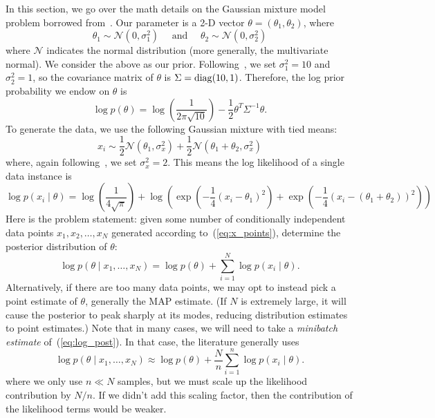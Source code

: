 \documentclass{article}
\begin{document}
In this section, we go over the math details on the Gaussian mixture model problem borrowed
from~\cite{langevin_2011}. Our parameter is a 2-D vector $\theta =
(\theta_1, \theta_2)$, where
\begin{equation}
\theta_1 \sim \mathcal{N}(0, \sigma_1^2) \quad \mbox{ and } \quad \theta_2 \sim \mathcal{N}(0, \sigma_2^2)
\end{equation}
where $\mathcal{N}$ indicates the normal distribution (more generally, the multivariate normal). We
consider the above as our prior. Following~\cite{langevin_2011}, we set $\sigma_1^2 = 10$ and
$\sigma_2^2=1$, so the covariance matrix of $\theta$ is $\Sigma = {\rm diag}(10,1)$. Therefore, the
log prior probability we endow on $\theta$ is
\begin{equation}
\log p(\theta) = \log \left(\frac{1}{2\pi\sqrt{10}}\right) - \frac{1}{2}\theta^T\Sigma^{-1}\theta.
\end{equation}
To generate the data, we use the following Gaussian mixture with tied means:
\begin{equation}\label{eq:x_points}
x_i \sim \frac{1}{2}\mathcal{N}(\theta_1, \sigma_x^2) + \frac{1}{2}\mathcal{N}(\theta_1+\theta_2, \sigma_x^2)
\end{equation}
where, again following~\cite{langevin_2011}, we set $\sigma_x^2 = 2$. This means the log likelihood
of a single data instance is
\begin{equation}
\log p(x_i \mid \theta) = \log\left(\frac{1}{4\sqrt{\pi}}\right) +
\log\left(\exp\left(-\frac{1}{4}(x_i - \theta_1)^2\right) + \exp\left(-\frac{1}{4}(x_i -
(\theta_1+\theta_2))^2\right)\right)
\end{equation}
Here is the problem statement: given some number of conditionally independent data points $x_1, x_2,
\ldots, x_N$ generated according to~(\ref{eq:x_points}), determine the posterior
distribution of $\theta$:
\begin{equation}\label{eq:log_post}
\log p(\theta \mid x_1,\ldots,x_N) = \log p(\theta) + \sum_{i=1}^N\log p(x_i \mid \theta).
\end{equation}
Alternatively, if there are too many data points, we may opt to instead pick a point estimate of
$\theta$, generally the MAP estimate. (If $N$ is extremely large, it will cause the posterior to
peak sharply at its modes, reducing distribution estimates to point estimates.) Note that in many
cases, we will need to take a \emph{minibatch estimate} of~(\ref{eq:log_post}). In that case, the
literature generally uses
\begin{equation}\label{eq:scaling_factor}
\log p(\theta \mid x_1,\ldots,x_N) \approx \log p(\theta) + \frac{N}{n} \sum_{i=1}^n\log p(x_i \mid \theta).
\end{equation}
where we only use $n \ll N$ samples, but we must scale up the likelihood contribution by $N/n$. If we
didn't add this scaling factor, then the contribution of the likelihood terms would be weaker.
\end{document}
